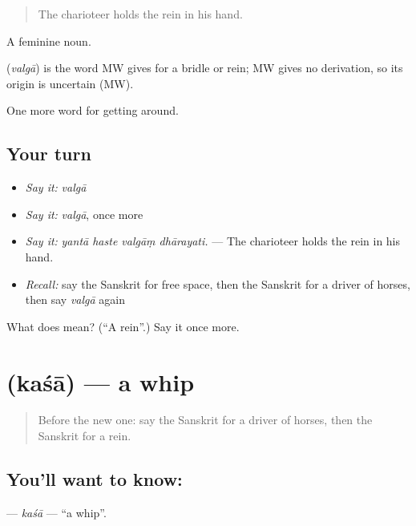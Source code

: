 \begin{quote}
The charioteer holds the rein in his hand.
\end{quote}

A feminine noun.

\begin{cousinweb}
\textbf{} (\emph{valgā}) is the word MW gives for a bridle or rein; MW gives no derivation, so its origin is uncertain (MW).
\end{cousinweb}

\begin{grammarlens}[title={What you've built}]
One more word for getting around.
\end{grammarlens}

\subsection*{Your turn}
\begin{itemize}
\raggedright
  \item \emph{Say it:} \emph{valgā}
  \item \emph{Say it:} \emph{valgā}, once more
  \item \emph{Say it:} \emph{yantā haste valgāṃ dhārayati.} — The charioteer holds the rein in his hand.
  \item \emph{Recall:} say the Sanskrit for free space, then the Sanskrit for a driver of horses, then say \emph{valgā} again
\end{itemize}

\begin{tcolorbox}[breakable,colback=teal!4,colframe=teal!35!black,title={Before you move on}]
What does  mean? (\textquotedblleft{}A rein\textquotedblright{}.) Say it once more.
\end{tcolorbox}
\section[\texorpdfstring{\sk{कशा} (kaśā)}{कशा (kaśā)}]{ (kaśā) — a whip}

\label{lesson:SA-C407-kasa}



\begin{quote}
Before the new one: say the Sanskrit for a driver of horses, then the Sanskrit for a rein.
\end{quote}

\subsection*{You'll want to know: }
\textbf{} — \emph{kaśā} — \textquotedblleft{}a whip\textquotedblright{}.

